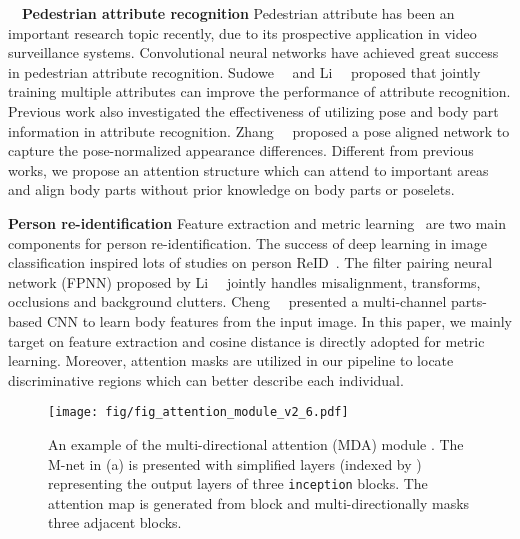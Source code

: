 \documentclass[10pt,twocolumn,letterpaper]{article}
\begin{document}
\noindent　\textbf{Pedestrian attribute recognition}
Pedestrian attribute has been an important research topic recently, due to its prospective application in video surveillance systems. Convolutional neural networks have achieved great success in pedestrian attribute recognition. Sudowe~\etal~\cite{sudowe2015person} and Li~\etal~\cite{li2015multi} proposed that jointly training multiple attributes can improve the performance of attribute recognition.
Previous work also investigated the effectiveness of utilizing pose and body part information in attribute recognition.
Zhang~\etal~\cite{zhang2014panda} proposed a pose aligned network to capture the pose-normalized appearance differences.
Different from previous works, we propose an attention structure which can attend to important areas and align body parts without prior knowledge on body parts or poselets.

\noindent \textbf{Person re-identification}
Feature extraction and metric learning~\cite{koestinger2012large,liao2015person} are two main components for person re-identification.
The success of deep learning in image classification inspired lots of studies on person ReID~\cite{cheng2016person, li2014deepreid, xiao2016learning, wu2016personnet, varior2016gated, su2016deep, ustinova2015multiregion, li2017person, xiao2017joint}.
The filter pairing neural network (FPNN) proposed by Li~\etal~\cite{li2014deepreid} jointly handles misalignment, transforms, occlusions and background clutters.
Cheng~\etal~\cite{cheng2016person} presented a multi-channel parts-based CNN to learn body features from the input image.
In this paper, we mainly target on feature extraction and cosine distance is directly adopted for metric learning.
Moreover, attention masks are utilized in our pipeline to locate discriminative regions which can better describe each individual.













\begin{figure}[t]
\centering
\texttt{[image: fig/fig\_attention\_module\_v2\_6.pdf]}
\caption{An example of the multi-directional attention (MDA) module . The M-net in (a) is presented with simplified layers (indexed by ) representing the output layers of three \texttt{inception} blocks. The attention map  is generated from block  and multi-directionally masks three adjacent blocks.
}
\label{fig:attention_module}
\end{figure}
\end{document}
